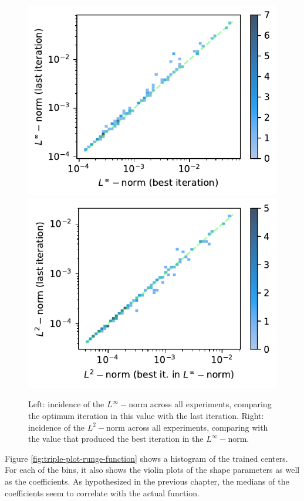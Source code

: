 \documentclass[12pt]{report} %
\begin{document}
\begin{figure}
  \includegraphics[width=.45\textwidth]{imagenes/experiments/1d/statistical_1d_full_scheduler_interpolation/runge_function/incidence_of_linf_runge_function.pdf}
  \includegraphics[width=.45\textwidth]{imagenes/experiments/1d/statistical_1d_full_scheduler_interpolation/runge_function/incidence_of_l2_runge_function.pdf}
  \caption{Left: incidence of the $L^\infty-$norm across all experiments, comparing the optimum iteration in this value with the last iteration. Right: incidence of the $L^2-$norm across all experiments, comparing with the value that produced the best iteration in the $L^\infty-$norm.}
  \label{fig:incidence-l-runge-function}
\end{figure}

Figure \ref{fig:triple-plot-runge-function} shows a histogram of the trained centers. For each of the bins, it also shows the violin plots of the shape parameters as well as the coefficients. As hypothesized in the previous chapter, the medians of the coefficients seem to correlate with the actual function.
\end{document}
